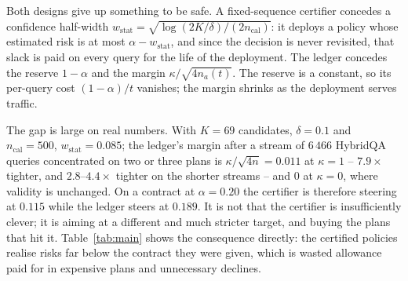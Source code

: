 Both designs give up something to be safe. A fixed-sequence certifier
concedes a confidence half-width
$w_{\mathrm{stat}} = \sqrt{\log(2K/\delta)/(2n_{\mathrm{cal}})}$: it
deploys a policy whose estimated risk is at most $\alpha -
w_{\mathrm{stat}}$, and since the decision is never revisited, that
slack is paid on every query for the life of the deployment. The ledger
concedes the reserve $1-\alpha$ and the margin
$\kappa/\sqrt{4n_a(t)}$. The reserve is a constant, so its per-query
cost $ (1-\alpha)/t $ vanishes; the margin shrinks as the deployment
serves traffic.

The gap is large on real numbers. With $K = 69$ candidates,
$\delta = 0.1$ and $n_{\mathrm{cal}} = 500$, $w_{\mathrm{stat}} =
0.085$; the ledger's margin after a stream of $6\,466$ HybridQA queries
concentrated on two or three plans is $\kappa/\sqrt{4n} = 0.011$ at
$\kappa=1$ -- $7.9\times$ tighter, and $2.8$--$4.4\times$ tighter on the
shorter streams -- and $0$ at $\kappa=0$, where validity is unchanged.
On a contract at $\alpha = 0.20$ the certifier is therefore steering at
$0.115$ while the ledger steers at $0.189$. It is not that the certifier
is insufficiently clever; it is aiming at a different and much stricter
target, and buying the plans that hit it. Table~\ref{tab:main} shows the
consequence directly: the certified policies realise risks far below the
contract they were given, which is wasted allowance paid for in
expensive plans and unnecessary declines.
